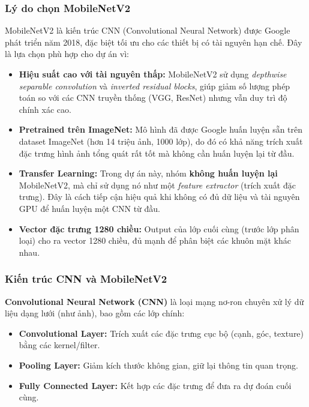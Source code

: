 \documentclass[a4paper]{book}
\begin{document}
\subsubsection{Lý do chọn MobileNetV2}
MobileNetV2 là kiến trúc CNN (Convolutional Neural Network) được Google phát triển năm 2018, đặc biệt tối ưu cho các thiết bị có tài nguyên hạn chế. Đây là lựa chọn phù hợp cho dự án vì:

\begin{itemize}
    \item \textbf{Hiệu suất cao với tài nguyên thấp:} MobileNetV2 sử dụng \textit{depthwise separable convolution} và \textit{inverted residual blocks}, giúp giảm số lượng phép toán so với các CNN truyền thống (VGG, ResNet) nhưng vẫn duy trì độ chính xác cao.
    
    \item \textbf{Pretrained trên ImageNet:} Mô hình đã được Google huấn luyện sẵn trên dataset ImageNet (hơn 14 triệu ảnh, 1000 lớp), do đó có khả năng trích xuất đặc trưng hình ảnh tổng quát rất tốt mà không cần huấn luyện lại từ đầu.
    
    \item \textbf{Transfer Learning:} Trong dự án này, nhóm \textbf{không huấn luyện lại} MobileNetV2, mà chỉ sử dụng nó như một \textit{feature extractor} (trích xuất đặc trưng). Đây là cách tiếp cận hiệu quả khi không có đủ dữ liệu và tài nguyên GPU để huấn luyện một CNN từ đầu.
    
    \item \textbf{Vector đặc trưng 1280 chiều:} Output của lớp cuối cùng (trước lớp phân loại) cho ra vector 1280 chiều, đủ mạnh để phân biệt các khuôn mặt khác nhau.
\end{itemize}

\subsubsection{Kiến trúc CNN và MobileNetV2}
\textbf{Convolutional Neural Network (CNN)} là loại mạng nơ-ron chuyên xử lý dữ liệu dạng lưới (như ảnh), bao gồm các lớp chính:
\begin{itemize}
    \item \textbf{Convolutional Layer:} Trích xuất các đặc trưng cục bộ (cạnh, góc, texture) bằng các kernel/filter.
    \item \textbf{Pooling Layer:} Giảm kích thước không gian, giữ lại thông tin quan trọng.
    \item \textbf{Fully Connected Layer:} Kết hợp các đặc trưng để đưa ra dự đoán cuối cùng.
\end{itemize}
\end{document}
